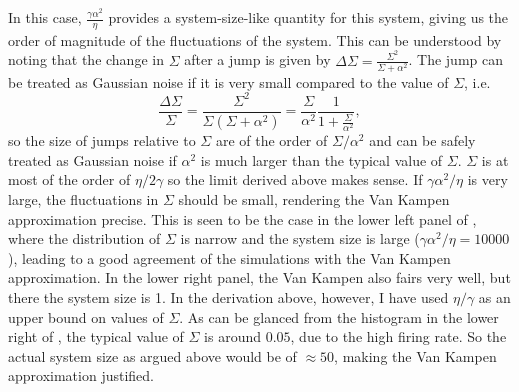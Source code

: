 In this case, $\frac{\gamma \alpha^2}{\eta}$ provides a system-size-like quantity for this system, giving us the order of magnitude of the fluctuations of the system. This can be understood
by noting that the change in $\Sigma$ after a jump is given by
$\Delta\Sigma = \frac{\Sigma^2}{\Sigma+\alpha^2}$. The jump can be treated as Gaussian noise if it is very small compared to the value of $\Sigma$, i.e.
\[
\frac{\Delta\Sigma}{\Sigma} = \frac{\Sigma^2}{\Sigma(\Sigma+\alpha^2)} = \frac{\Sigma}{\alpha^2} \frac{1}{1+\frac{\Sigma}{\alpha^2}},
\]
so the size of jumps relative to $\Sigma$ are of the order of $\Sigma/\alpha^2$ and can be safely treated as Gaussian noise if $\alpha^2$ is much larger than the typical value of 
$\Sigma$. $\Sigma$ is at most of the order of $\eta/2\gamma$ so the limit derived above makes sense. If $\gamma\alpha^2/\eta$ is very large, the fluctuations in $\Sigma$ should be 
small, rendering the Van Kampen approximation precise. This is seen to be the case in the lower left panel of
, where the distribution of $\Sigma$ is narrow and the system size is large ($\gamma\alpha^2/\eta = 10000$), leading to a good agreement of the simulations with the 
Van Kampen approximation. In the lower right panel, the Van Kampen also fairs very well, but there the system size is 1. In the derivation above, however, I have used $\eta/\gamma$ as an upper
bound on values of $\Sigma$. As can be glanced from the histogram in the lower right of , the typical value of $\Sigma$ is around $0.05$, due to the high firing rate.
So the actual system size as argued above would be of $\approx 50$, making the Van Kampen approximation justified.

